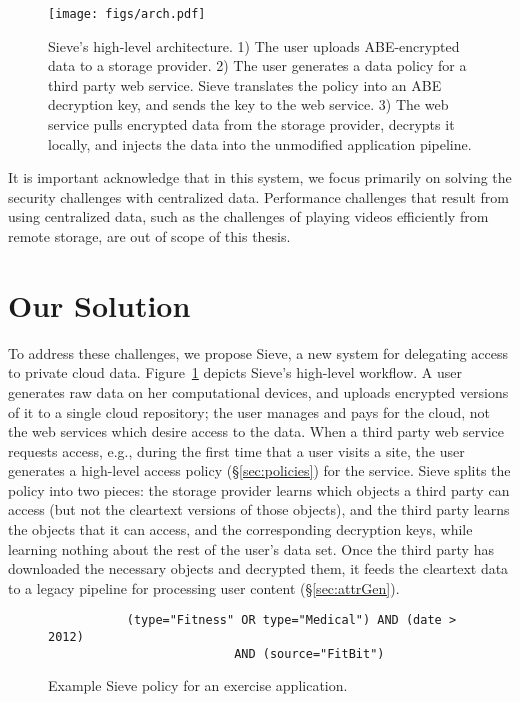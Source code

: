 \begin{figure}
  \centering
     \texttt{[image: figs/arch.pdf]}
     \caption[Sieve's high-level architecture]
     {Sieve's high-level architecture. 1) The user uploads
              ABE-encrypted data to a storage provider. 2) The user
              generates a data policy for a third party web
              service. Sieve translates the policy into an ABE
              decryption key, and sends the key to the web service.
              3) The web service pulls encrypted data from the
              storage provider, decrypts it locally, and injects
              the data into the unmodified application pipeline.}
  \label{fig:sieve}
\end{figure}

It is important acknowledge that in this system,
we focus primarily on solving the security challenges
with centralized data. Performance challenges that result
from using centralized data, such as the challenges of
playing videos efficiently from 
remote storage, are out of scope of this thesis.

\section{Our Solution}

To address these challenges, we propose Sieve,
a new system for delegating access to
private cloud data. Figure~\ref{fig:sieve} depicts
Sieve's high-level workflow. A user generates
raw data on her computational devices, and
uploads encrypted versions of it to a single cloud
repository; the user manages and pays for the 
cloud, not the web services which
desire access to the data. When a third party web service
requests access, e.g., during the first
time that a user visits a site, the user
generates a high-level access policy (\S\ref{sec:policies})
for the service. Sieve splits the policy into
two pieces: the storage provider learns which
objects a third party can access (but not the
cleartext versions of those objects), and the
third party learns the objects that it can
access, and the corresponding decryption keys,
while learning nothing about the rest of the
user's data set. Once the third party has
downloaded the necessary objects and decrypted
them, it feeds the cleartext data to a legacy
pipeline for processing user content (\S\ref{sec:attrGen}).

\begin{figure}
\centering
\begin{verbatim}
           (type="Fitness" OR type="Medical") AND (date > 2012) 
                          AND (source="FitBit") 
\end{verbatim}
\caption[Example Sieve policy]{Example Sieve policy for an exercise application.}
\label{fig:policyex}
\end{figure}


